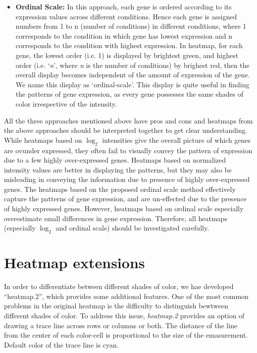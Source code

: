 \documentclass[12pt, oneside, letterpaper]{article}
\begin{document}
\begin{itemize}
\item \textbf{Ordinal Scale:}
	In this approach, each gene is ordered according to its
	expression values across different conditions. Hence each
	gene is assigned numbers from 1 to n (number of conditions)
	in different conditions, where 1 corresponds to the
	condition in which gene has lowest expression and n
	corresponds to the condition with highest expression. In
	heatmap, for each gene, the lowest order (i.e. 1) is
	displayed by brightest green, and highest order
	(i.e. `\textit{n}', where \textit{n} is the number of
	conditions) by brighest red, then the overall display
	becomes independent of the amount of expression of the gene.
	We name this display as `ordinal-scale'. This display is
	quite useful in finding the patterns of gene expression, as
	every gene possesses the same shades of color irrespective
	of the intensity.

\end{itemize}


	All the three approaches mentioned above have pros and cons
	and heatmaps from the above approaches should be interpreted
	together to get clear understanding.  While heatmaps based
	on $\log_2$ intensities give the overall picture of which
	genes are ovunder expressed, they often fail to visually
	convey the pattern of expression due to a few highly
	over-expressed genes. Heatmaps based on normalized intensity
	values are better in displaying the patterns, but they may
	also be misleading in conveying the information due to
	presence of highly over-expressed genes.  The heatmaps based
	on the proposed ordinal scale method effectively capture the
	patterns of gene expression, and are un-effected due to the
	presence of highly expressed genes. However, heatmaps based
	on ordinal scale especially overestimate small differences
	in gene expression.  Therefore, all heatmaps (especially
	$\log_2$ and ordinal scale) should be investigated
	carefully.

\section*{Heatmap extensions}

	In order to differentiate between different shades of color,
	we hae developed ``heatmap.2'', which provides some
	additional features. One of the most common problems in the
	original heatmap is the difficulty to distinguish bewtween
	different shades of color. To address this issue,
	\textit{heatmap.2} provides an option of drawing a trace
	line across rows or columns or both. The distance of the
	line from the center of each color-cell is proportional to
	the size of the emasurement. Default color of the trace line
	is cyan.
\end{document}
